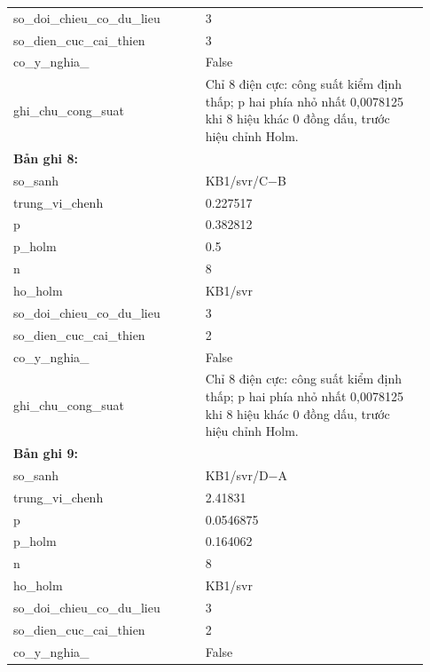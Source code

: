 \begin{longtable}{p{0.43\linewidth}p{0.50\linewidth}}
so\_\allowbreak doi\_\allowbreak chieu\_\allowbreak co\_\allowbreak du\_\allowbreak lieu & 3 \\
so\_\allowbreak dien\_\allowbreak cuc\_\allowbreak cai\_\allowbreak thien & 3 \\
co\_\allowbreak y\_\allowbreak nghia\_\allowbreak 005 & False \\
ghi\_\allowbreak chu\_\allowbreak cong\_\allowbreak suat & Chỉ 8 điện cực: công suất kiểm định thấp; p hai phía nhỏ nhất 0,0078125 khi 8 hiệu khác 0 đồng dấu, trước hiệu chỉnh Holm. \\
\midrule
\multicolumn{2}{p{0.95\linewidth}}{\textbf{Bản ghi 8: }} \\
so\_\allowbreak sanh & KB1/svr/C−B \\
trung\_\allowbreak vi\_\allowbreak chenh & 0.227517 \\
p & 0.382812 \\
p\_\allowbreak holm & 0.5 \\
n & 8 \\
ho\_\allowbreak holm & KB1/svr \\
so\_\allowbreak doi\_\allowbreak chieu\_\allowbreak co\_\allowbreak du\_\allowbreak lieu & 3 \\
so\_\allowbreak dien\_\allowbreak cuc\_\allowbreak cai\_\allowbreak thien & 2 \\
co\_\allowbreak y\_\allowbreak nghia\_\allowbreak 005 & False \\
ghi\_\allowbreak chu\_\allowbreak cong\_\allowbreak suat & Chỉ 8 điện cực: công suất kiểm định thấp; p hai phía nhỏ nhất 0,0078125 khi 8 hiệu khác 0 đồng dấu, trước hiệu chỉnh Holm. \\
\midrule
\multicolumn{2}{p{0.95\linewidth}}{\textbf{Bản ghi 9: }} \\
so\_\allowbreak sanh & KB1/svr/D−A \\
trung\_\allowbreak vi\_\allowbreak chenh & 2.41831 \\
p & 0.0546875 \\
p\_\allowbreak holm & 0.164062 \\
n & 8 \\
ho\_\allowbreak holm & KB1/svr \\
so\_\allowbreak doi\_\allowbreak chieu\_\allowbreak co\_\allowbreak du\_\allowbreak lieu & 3 \\
so\_\allowbreak dien\_\allowbreak cuc\_\allowbreak cai\_\allowbreak thien & 2 \\
co\_\allowbreak y\_\allowbreak nghia\_\allowbreak 005 & False \\

\end{longtable}
